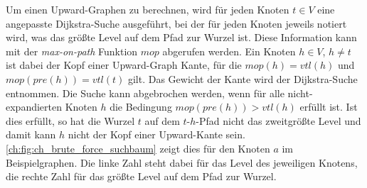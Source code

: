 Um einen Upward-Graphen zu berechnen, wird für jeden Knoten $t \in V$ eine angepasste Dijkstra-Suche ausgeführt, bei der für jeden Knoten jeweils notiert wird, was das größte Level auf dem Pfad zur Wurzel ist.
Diese Information kann mit der \emph{max-on-path} Funktion ${mop}$ abgerufen werden.
Ein Knoten $h \in V$, $h \neq t$ ist dabei der Kopf einer Upward-Graph Kante, für die ${mop}(h) = {vtl}(h)$ und ${mop}({pre}(h)) = {vtl}(t)$ gilt.
Das Gewicht der Kante wird der Dijkstra-Suche entnommen.
Die Suche kann abgebrochen werden, wenn für alle nicht-expandierten Knoten $h$ die Bedingung ${mop}({pre}(h)) > {vtl}(h)$ erfüllt ist.
Ist dies erfüllt, so hat die Wurzel $t$ auf dem $t$-$h$-Pfad nicht das zweitgrößte Level und damit kann $h$ nicht der Kopf einer Upward-Kante sein.
\autoref{ch:fig:ch_brute_force_suchbaum} zeigt dies für den Knoten $a$ im Beispielgraphen.
Die linke Zahl steht dabei für das Level des jeweiligen Knotens, die rechte Zahl für das größte Level auf dem Pfad zur Wurzel.

